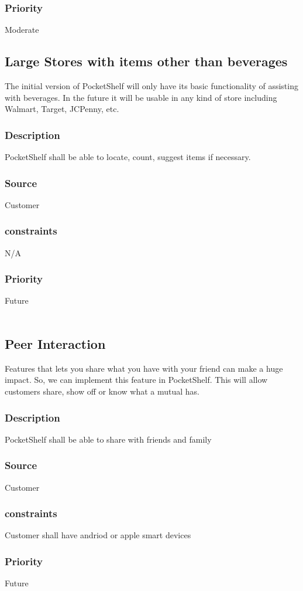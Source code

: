 \subsubsection{Priority}
Moderate
\\

\subsection{Large Stores with items other than beverages}
The initial version of PocketShelf will only have its basic functionality of assisting with beverages. In the future it will be usable in any kind of store including Walmart, Target, JCPenny, etc.
\subsubsection{Description}
PocketShelf shall be able to locate, count, suggest items if necessary.
\subsubsection{Source}
Customer
\subsubsection{constraints}
 N/A
\subsubsection{Priority}
Future
\\
\\

\subsection{Peer Interaction}
Features that lets you share what you have with your friend can make a huge impact. So, we can implement this feature in PocketShelf. This will allow customers share, show off or know what a mutual has.
\subsubsection{Description}
PocketShelf shall be able to share with friends and family
\subsubsection{Source}
Customer
\subsubsection{constraints}
 Customer shall have andriod or apple smart devices
\subsubsection{Priority}
Future